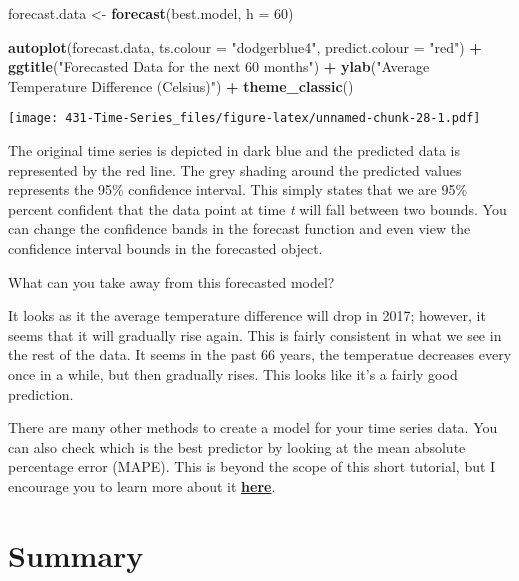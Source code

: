 \documentclass[
]{book}
\newenvironment{Shaded}{\begin{snugshade}}{\end{snugshade}}
\newcommand{\DataTypeTok}[1]{\textcolor[rgb]{0.13,0.29,0.53}{#1}}
\newcommand{\DecValTok}[1]{\textcolor[rgb]{0.00,0.00,0.81}{#1}}
\newcommand{\KeywordTok}[1]{\textcolor[rgb]{0.13,0.29,0.53}{\textbf{#1}}}
\newcommand{\NormalTok}[1]{#1}
\newcommand{\OperatorTok}[1]{\textcolor[rgb]{0.81,0.36,0.00}{\textbf{#1}}}
\newcommand{\StringTok}[1]{\textcolor[rgb]{0.31,0.60,0.02}{#1}}
\begin{document}
\begin{Shaded}
\begin{Highlighting}[]
\NormalTok{forecast.data <-}\StringTok{ }\KeywordTok{forecast}\NormalTok{(best.model, }\DataTypeTok{h =} \DecValTok{60}\NormalTok{)}

\KeywordTok{autoplot}\NormalTok{(forecast.data, }\DataTypeTok{ts.colour =} \StringTok{"dodgerblue4"}\NormalTok{, }\DataTypeTok{predict.colour =} \StringTok{"red"}\NormalTok{) }\OperatorTok{+}
\StringTok{  }\KeywordTok{ggtitle}\NormalTok{(}\StringTok{"Forecasted Data for the next 60 months"}\NormalTok{) }\OperatorTok{+}\StringTok{ }
\StringTok{  }\KeywordTok{ylab}\NormalTok{(}\StringTok{"Average Temperature Difference (Celsius)"}\NormalTok{) }\OperatorTok{+}
\StringTok{  }\KeywordTok{theme_classic}\NormalTok{()}
\end{Highlighting}
\end{Shaded}

\texttt{[image: 431-Time-Series\_files/figure-latex/unnamed-chunk-28-1.pdf]}

The original time series is depicted in dark blue and the predicted data is represented by the red line. The grey shading around the predicted values represents the 95\% confidence interval. This simply states that we are 95\% percent confident that the data point at time \emph{t} will fall between two bounds. You can change the confidence bands in the forecast function and even view the confidence interval bounds in the forecasted object.

What can you take away from this forecasted model?

It looks as it the average temperature difference will drop in 2017; however, it seems that it will gradually rise again. This is fairly consistent in what we see in the rest of the data. It seems in the past 66 years, the temperatue decreases every once in a while, but then gradually rises. This looks like it's a fairly good prediction.

There are many other methods to create a model for your time series data. You can also check which is the best predictor by looking at the mean absolute percentage error (MAPE). This is beyond the scope of this short tutorial, but I encourage you to learn more about it \href{https://www.pluralsight.com/guides/time-series-forecasting-using-r}{\textbf{here}}.

\hypertarget{summary}{%
\chapter{Summary}\label{summary}}
\end{document}
